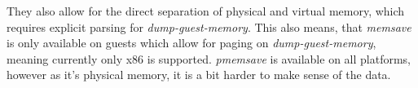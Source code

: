 They also allow for the direct separation of physical and virtual memory,
which requires explicit parsing for \emph{dump-guest-memory}.
This also means, that \emph{memsave} is only available on guests which allow for paging on \emph{dump-guest-memory},
meaning currently only x86 is supported.
\emph{pmemsave} is available on all platforms, however as it's physical memory,
it is a bit harder to make sense of the data.
